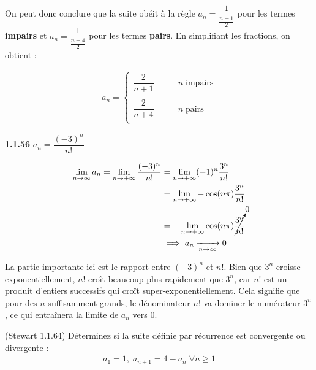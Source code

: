 \documentclass{report}
\begin{document}
    On peut donc conclure que la suite obéit à la règle 
    $a_n = \dfrac{1}{\frac{n+1}{2}}$ pour les termes \textbf{impairs} et 
    $a_n = \dfrac{1}{\frac{n + 4}{2}}$ pour les
    termes \textbf{pairs}. En simplifiant les fractions, on obtient :


    \begin{align*}
        a_n = 
        \begin{cases}
            \dfrac{2}{n+1} & \quad \quad n \; \text{impairs} \\ 
            \\
            \dfrac{2}{n+4} & \quad \quad n \; \text{pairs} \\ 
        \end{cases}
    \end{align*}        




    \vspace{1em}


    \noindent \textbf{1.1.56}  $a_n = \dfrac{(-3)^n}{n!}$




    \begin{align*}
        \lim\limits_{n\to \infty} a_n = \lim\limits_{n \to+\infty }\dfrac{(-3)^n}{n!} 
        &= 
        \lim\limits_{n \to+\infty } (-1)^n  \dfrac{3^n}{n!} \\ 
        &=
        \lim\limits_{n\to +\infty} -\cos(n\pi)\dfrac{3^n}{n!} \\ 
        &= 
        -\lim\limits_{n\to +\infty} \cos(n\pi)\cancelto{0}{\dfrac{3^n}{n!}}\\ 
        &\implies a_n \xrightarrow[n\to \infty]{} 0
    \end{align*}


    La partie importante ici est le rapport entre \( (-3)^n \) et \( n! \). Bien que \( 3^n \)
    croisse exponentiellement, \( n! \) croît beaucoup plus rapidement que \( 3^n \), car 
    \( n! \) est un produit d'entiers successifs qui croît super-exponentiellement. Cela 
    signifie que pour des \( n \) suffisamment grands, le dénominateur \( n! \) va dominer 
    le numérateur \( 3^n \), ce qui entraînera la limite de \( a_n \) vers 0.


    \begin{Exercice}{(Stewart 1.1.64)}{}
        Déterminez si la suite définie par récurrence est convergente ou divergente : 
        \begin{align*}
            a_1 = 1, \; a_{n+1} = 4 - a_n \; \forall n \geq 1
        \end{align*}
    \end{Exercice}
\end{document}
